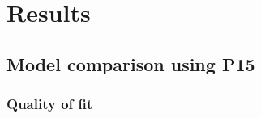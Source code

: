 \graphicspath{{images/}}

\section{Results}
\label{sec:results}





\subsection{Model comparison using P15}
\label{sec:P15_fit}
\subsubsection{Quality of fit}

